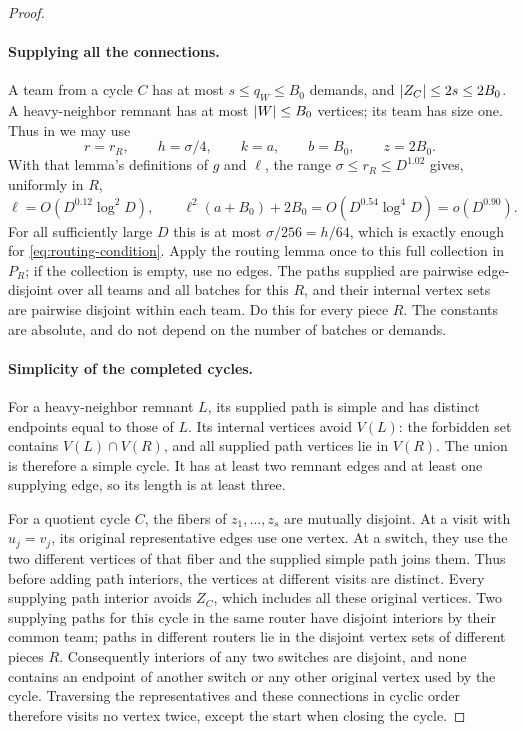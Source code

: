 \begin{proof}
\paragraph{Supplying all the connections.}
A team from a cycle $C$ has at most $s\le q_W\le B_0$ demands, and
$\left|Z_C\right|\le2s\le2B_0$.  A heavy-neighbor remnant has at most
$\left|W\right|\le B_0$ vertices; its team has size one.  Thus in
 we may use
\[
 r=r_R,\qquad h=\sigma/4,\qquad
 k=a,\qquad b=B_0,\qquad z=2B_0.
\]
With that lemma's definitions of $g$ and $\ell$, the range
$\sigma\le r_R\le D^{1.02}$ gives, uniformly in $R$,
\[
 \ell=O(D^{0.12}\log^2 D),
 \qquad
 \ell^2(a+B_0)+2B_0
       =O(D^{0.54}\log^4 D)=o(D^{0.90}).
\]
For all sufficiently large $D$ this is at most $\sigma/256=h/64$,
which is exactly enough for \eqref{eq:routing-condition}.  Apply the
routing lemma once to this full collection in $P_R$; if the collection
is empty, use no edges.  The paths supplied are pairwise edge-disjoint
over all teams and all batches for this $R$, and their internal vertex
sets are pairwise disjoint within each team.  Do this for every piece
$R$.  The constants are absolute, and do not depend on the number of
batches or demands.

\paragraph{Simplicity of the completed cycles.}
For a heavy-neighbor remnant $L$, its supplied path is simple and has
distinct endpoints equal to those of $L$.  Its internal vertices avoid
$V(L)$: the forbidden set contains $V(L)\cap V(R)$, and all supplied
path vertices lie in $V(R)$.  The union
is therefore a simple cycle.  It has at least two remnant edges and at
least one supplying edge, so its length is at least three.

For a quotient cycle $C$, the fibers of $z_1,\ldots,z_s$ are mutually
disjoint.  At a visit with $u_j=v_j$, its original representative edges
use one vertex.  At a switch, they use the two different vertices of
that fiber and the supplied simple path joins them.  Thus before
adding path interiors, the vertices at different visits are distinct.
Every supplying path interior avoids $Z_C$, which includes all these
original vertices.  Two supplying paths for this cycle in the same
router have disjoint interiors by their common team; paths in different
routers lie in the disjoint vertex sets of different pieces $R$.
Consequently interiors of any two switches are disjoint, and none
contains an endpoint of another switch or any other original vertex
used by the cycle.  Traversing the representatives and these connections
in cyclic order therefore visits no vertex twice, except the start
when closing the cycle.


\end{proof}
